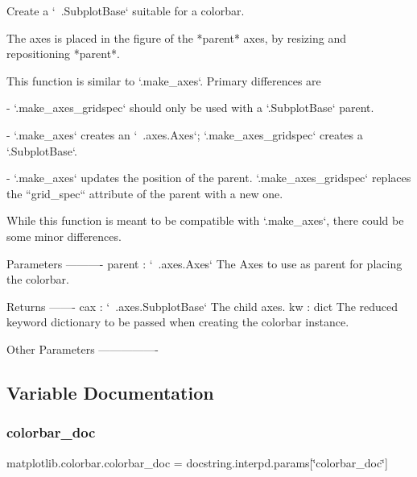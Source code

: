 \begin{DoxyVerb}Create a `~.SubplotBase` suitable for a colorbar.

The axes is placed in the figure of the *parent* axes, by resizing and
repositioning *parent*.

This function is similar to `.make_axes`. Primary differences are

- `.make_axes_gridspec` should only be used with a `.SubplotBase` parent.

- `.make_axes` creates an `~.axes.Axes`; `.make_axes_gridspec` creates a
  `.SubplotBase`.

- `.make_axes` updates the position of the parent.  `.make_axes_gridspec`
  replaces the ``grid_spec`` attribute of the parent with a new one.

While this function is meant to be compatible with `.make_axes`,
there could be some minor differences.

Parameters
----------
parent : `~.axes.Axes`
    The Axes to use as parent for placing the colorbar.

Returns
-------
cax : `~.axes.SubplotBase`
    The child axes.
kw : dict
    The reduced keyword dictionary to be passed when creating the colorbar
    instance.

Other Parameters
----------------
\end{DoxyVerb}
 

\subsection{Variable Documentation}
\mbox{\label{namespacematplotlib_1_1colorbar_a7ca9324c365b59716ce5f7d1521c64d7}} 
\subsubsection{\texorpdfstring{colorbar\+\_\+doc}{colorbar\_doc}}
{\footnotesize\ttfamily matplotlib.\+colorbar.\+colorbar\+\_\+doc = docstring.\+interpd.\+params\mbox{[}\char`\"{}colorbar\+\_\+doc\char`\"{}\mbox{]}}

\mbox{\label{namespacematplotlib_1_1colorbar_a68af3613ba2c4b30bcfe5ba521813a37}} 
